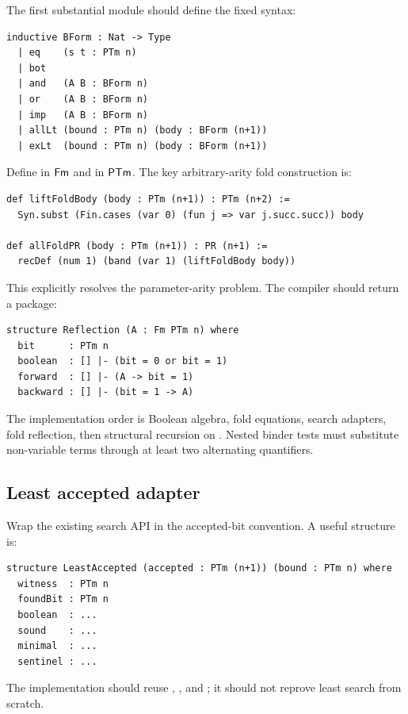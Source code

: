 The first substantial module should define the fixed syntax:

\begin{lstlisting}
inductive BForm : Nat -> Type
  | eq    (s t : PTm n)
  | bot
  | and   (A B : BForm n)
  | or    (A B : BForm n)
  | imp   (A B : BForm n)
  | allLt (bound : PTm n) (body : BForm (n+1))
  | exLt  (bound : PTm n) (body : BForm (n+1))
\end{lstlisting}

Define  in \(\mathsf{Fm}\) and  in \(\mathsf{PTm}\).  The key arbitrary-arity fold construction is:

\begin{lstlisting}
def liftFoldBody (body : PTm (n+1)) : PTm (n+2) :=
  Syn.subst (Fin.cases (var 0) (fun j => var j.succ.succ)) body

def allFoldPR (body : PTm (n+1)) : PR (n+1) :=
  recDef (num 1) (band (var 1) (liftFoldBody body))
\end{lstlisting}

This explicitly resolves the parameter-arity problem.  The compiler should return a package:

\begin{lstlisting}
structure Reflection (A : Fm PTm n) where
  bit      : PTm n
  boolean  : [] |- (bit = 0 or bit = 1)
  forward  : [] |- (A -> bit = 1)
  backward : [] |- (bit = 1 -> A)
\end{lstlisting}

The implementation order is Boolean algebra, fold equations, search adapters, fold reflection, then structural recursion on .  Nested binder tests must substitute non-variable terms through at least two alternating quantifiers.

\subsection{Least accepted adapter}

Wrap the existing search API in the accepted-bit convention.  A useful structure is:

\begin{lstlisting}
structure LeastAccepted (accepted : PTm (n+1)) (bound : PTm n) where
  witness  : PTm n
  foundBit : PTm n
  boolean  : ...
  sound    : ...
  minimal  : ...
  sentinel : ...
\end{lstlisting}

The implementation should reuse , , and ; it should not reprove least search from scratch.

